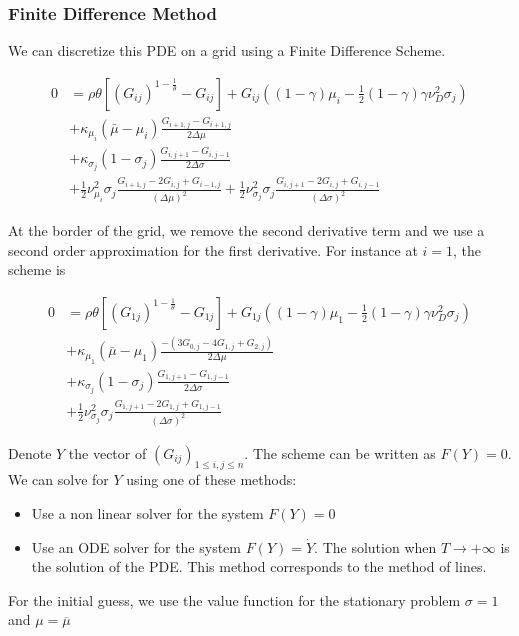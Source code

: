 \documentclass[english]{article}
\begin{document}
\subsubsection{Finite Difference Method}
			
We can discretize this PDE on a grid using a Finite Difference Scheme. 

\begin{align*}
	0&= \rho \theta[(G_{ij})^{1-\frac{1}{\theta}}- G_{ij}]+G_{ij}((1-\gamma)\mu_i-\frac{1}{2}(1-\gamma)\gamma\nu_D^2\sigma_j)\\
	&+\kappa_{\mu_i}(\bar{\mu}-\mu_i)\frac{G_{i+1, j}-G_{i+1, j}}{2\Delta \mu}\\
	&+\kappa_{\sigma_j}(1-\sigma_j)\frac{G_{i, j+1}-G_{i,j-1}}{2\Delta \sigma}\\
	&+\frac{1}{2}\nu_{\mu_i}^{2}\sigma_j\frac{G_{i+1, j} - 2 G_{i, j} + G_{i-1, j}}{(\Delta\mu)^2}+\frac{1}{2}\nu_{\sigma_j}^{2}\sigma_j\frac{G_{i, j+1} - 2 G_{i, j} + G_{i, j-1}}{(\Delta\sigma)^2}
\end{align*}

At the border of the grid, we remove the second derivative term and we use a second order approximation for the first derivative. For instance at $i = 1$, the scheme is 

\begin{align*}
	0&= \rho \theta[(G_{1j})^{1-\frac{1}{\theta}}- G_{1j}]+G_{1j}((1-\gamma)\mu_1-\frac{1}{2}(1-\gamma)\gamma\nu_D^2\sigma_j)\\
	&+\kappa_{\mu_1}(\bar{\mu}-\mu_1)\frac{-(3G_{0,j} - 4 G_{1,j} + G_{2,j})}{2\Delta \mu}\\
	&+\kappa_{\sigma_j}(1-\sigma_j)\frac{G_{1, j+1}-G_{1,j-1}}{2\Delta \sigma}\\
	&+\frac{1}{2}\nu_{\sigma_j}^{2}\sigma_j\frac{G_{1, j+1} - 2 G_{1, j} + G_{1, j-1}}{(\Delta\sigma)^2}
\end{align*}


Denote $Y$ the vector of  $(G_{ij})_{1 \leq i,j\leq n}$. The scheme can be written as $F(Y) = 0$. We can solve for $Y$ using one of these methods:
\begin{itemize}
	\item Use a non linear solver for the system $F(Y) = 0$
	\item Use an ODE solver for the system $F(Y) = \dot{Y}$. The solution when $T\rightarrow +\infty$ is the solution of the PDE. This method corresponds to the method of lines.
\end{itemize}

For the initial guess, we use the value function for the stationary problem $\sigma = 1$ and $\mu = \overline{\mu}$
			
\end{document}
